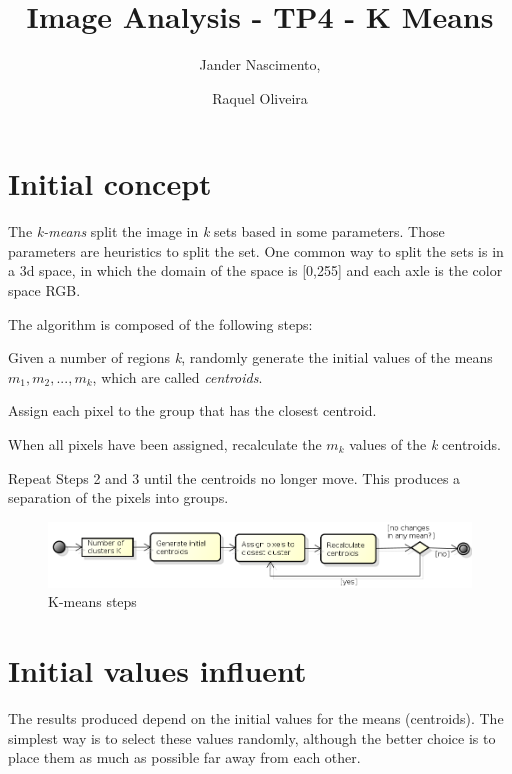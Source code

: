 \documentclass{article}
\newcounter{qcounter}
\begin{document}
\title{Image Analysis - TP4 - K Means}

\author{Jander Nascimento, 
\and Raquel Oliveira}

\maketitle

\section{Initial concept}

The \emph{k-means} split the image in \emph{k} sets based in some parameters. Those parameters are heuristics to split the set. One common way to split the sets is in a 3d space, in which the domain of the space is [0,255] and each axle is the color space RGB. 

The algorithm is composed of the following steps:
\begin{list}{:~}{}
\item Given a number of regions \emph{k}, randomly generate the initial values of the means $m_1, m_2, ..., m_k$, which are called \emph{centroids}.
\item Assign each pixel to the group that has the closest centroid.
\item When all pixels have been assigned, recalculate the $m_k$ values of the \emph{k} centroids.
\item Repeat Steps 2 and 3 until the centroids no longer move. This produces a separation of the pixels into groups.
\end{list}

\begin{figure}[H]
\centering
\includegraphics[width=1.0\textwidth]{../image/ActivityDiagram.png}
\caption{K-means steps}
\label{fig:kmeans}
\end{figure}

\section{Initial values influent}

The results produced depend on the initial values for the means (centroids). The simplest way is to select these values randomly, although the better choice is to place them as much as possible far away from each other.
\end{document}
